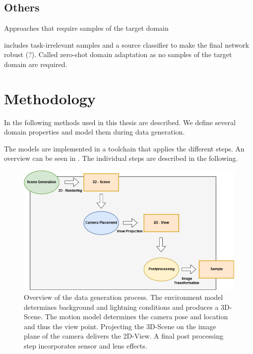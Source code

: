 \subsection{Others}
Approaches that require samples of the target domain \cite{Chen2018c} \cite{Xu2017} \cite{Inoue} 

\cite{Peng2017} includes task-irrelevant samples and a source classifier to make the final network robust (?). Called zero-shot domain adaptation as no samples of the target domain are required.


\section{Methodology}
\label{sec:training:meth}

In the following methods used in this thesis are described. We define several domain properties and model them during data generation.

The models are implemented in a toolchain that applies the different steps. An overview can be seen in  . The individual steps are described in the following.

\begin{figure}[htbp]
	\centering
	\includegraphics[width=\textwidth]{fig/Toolchain_datagen}
	\caption{Overview of the data generation process. The environment model determines background and lightning conditions and produces a 3D-Scene. The motion model determines the camera pose and location and thus the view point. Projecting the 3D-Scene on the image plane of the camera delivers the 2D-View. A final post processing step incorporates sensor and lens effects.}
	\label{fig:training:toolchain_datagen}
\end{figure}

